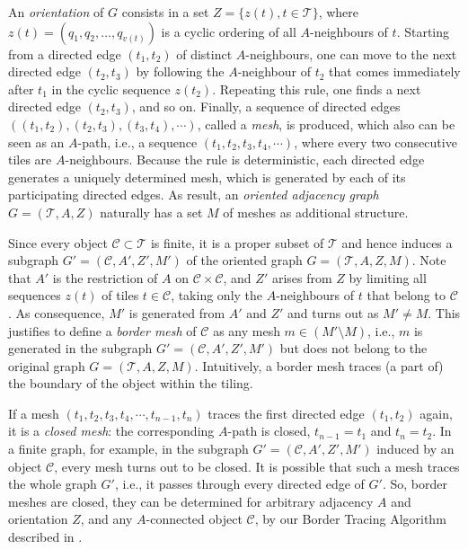 An \emph{orientation} of $G$ consists in a set $Z=\{ z(t), t\in \mathcal{T}\}$, where $z(t) = (q_1, q_2, \dots, q_{v(t)})$ is a cyclic ordering of all $A$-neighbours of $t$.
Starting from a directed edge $(t_1,t_2)$ of distinct $A$-neighbours, one can move to the next directed edge $(t_2,t_3)$ by following the $A$-neighbour of $t_2$ that comes immediately after $t_1$ in the cyclic sequence $z(t_2)$. Repeating this rule, one finds a next directed edge $(t_2,t_3)$, and so on. Finally, a sequence of directed edges $((t_1,t_2), (t_2,t_3), (t_3,t_4), \cdots )$, called a \emph{mesh}, is produced, which also can be seen as an $A$-path, i.e., a sequence $(t_1, t_2, t_3, t_4, \cdots )$, where every two consecutive tiles are $A$-neighbours. Because the rule is deterministic, each directed edge generates a uniquely determined mesh, which is generated by each of its participating directed edges. As result, an \emph{oriented adjacency graph} $G = (\mathcal{T}, A, Z)$ naturally has a set $M$ of meshes as additional structure.

Since every object $\mathcal{C} \subset \mathcal{T}$ is finite, it is a proper subset of $\mathcal{T}$ and hence induces a subgraph $G' = (\mathcal{C}, A', Z', M')$ of the oriented graph $G = (\mathcal{T}, A, Z, M)$. Note that $A'$ is the restriction of $A$ on $\mathcal{C}\times \mathcal{C}$, and $Z'$ arises from $Z$ by limiting all sequences $z(t)$ of tiles $t\in \mathcal{C}$, taking only the $A$-neighbours of $t$ that belong to $\mathcal{C}$. As consequence, $M'$ is generated from $A'$ and $Z'$ and turns out as $M'\neq M$. This justifies to define a \emph{border mesh} of $\mathcal{C}$ as any mesh $m\in (M'\setminus M)$, i.e., $m$ is generated in the subgraph $G' = (\mathcal{C}, A', Z', M')$ but does not belong to the original graph $G = (\mathcal{T}, A, Z, M)$. Intuitively, a border mesh traces (a part of) the boundary of the object within the tiling.

If a mesh $(t_1, t_2, t_3, t_4, \cdots , t_{n-1}, t_n)$ traces the first directed edge $(t_1,t_2)$ again, it is a \emph{closed mesh}: the corresponding $A$-path is closed, $t_{n-1} = t_1$ and $t_n = t_2$. In a finite graph, for example, in the subgraph $G' = (\mathcal{C}, A', Z', M')$ induced by an object $\mathcal{C}$, every mesh turns out to be closed. It is possible that such a mesh traces the whole graph $G'$, i.e., it passes through every directed edge of $G'$. So, border meshes are closed, they can be determined for arbitrary adjacency $A$ and orientation $Z$, and any $A$-connected object $\mathcal{C}$, by our Border Tracing Algorithm described in \cite{WiederholdMatosWiederhold2026}.
 

